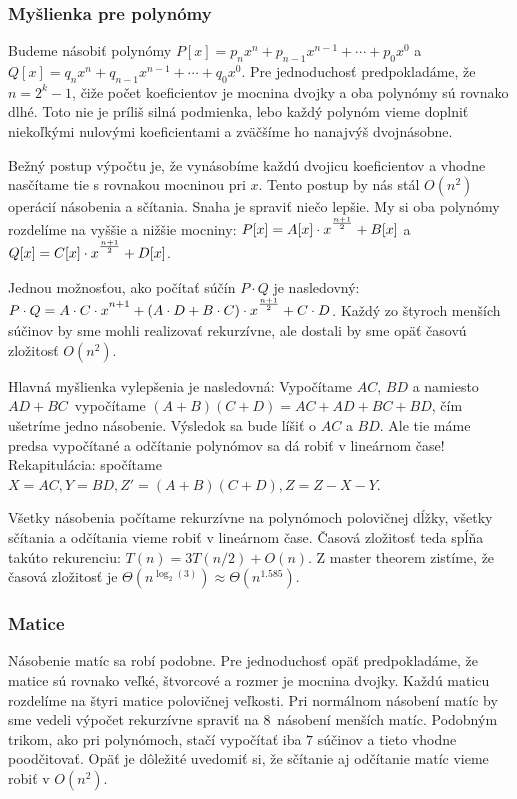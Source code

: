         \subsubsection{Myšlienka pre polynómy}
        Budeme násobiť polynómy $P[x] = p_nx^n + p_{n-1}x^{n-1} + \cdots + p_0x^0 $ a $Q[x] = q_nx^n + q_{n-1}x^{n-1} + \cdots + q_0x^0$.
        Pre jednoduchosť predpokladáme, že $n = 2^k - 1$, čiže počet koeficientov je mocnina dvojky a oba polynómy sú rovnako
        dlhé. Toto nie je príliš silná podmienka, lebo každý polynóm vieme doplniť niekoľkými nulovými koeficientami a zväčšíme
        ho nanajvýš dvojnásobne.

        Bežný postup výpočtu je, že vynásobíme každú dvojicu koeficientov a vhodne nasčítame tie s rovnakou mocninou pri $x$.
        Tento postup by nás stál $O(n^2)$ operácií násobenia a sčítania. Snaha je spraviť niečo lepšie.
        My si oba polynómy rozdelíme na vyššie a nižšie mocniny: $P[x] = A[x] \cdot x\strut^{\frac{n+1}{2}} + B[x]$ a $Q[x] = C[x] \cdot x\strut^{\frac{n+1}{2}} + D[x]$.

        Jednou možnosťou, ako počítať súčín $P\cdot Q$ je nasledovný: $P \cdot Q = A \cdot C \cdot x\strut^{n+1} + (A \cdot D + B \cdot C) \cdot x\strut^{\frac{n+1}{2}} + C \cdot D$.
        Každý zo štyroch menších súčinov by sme mohli realizovať rekurzívne, ale dostali by sme opäť časovú zložitosť
        $O(n^2)$.
        
        Hlavná myšlienka vylepšenia je nasledovná: Vypočítame $AC$, $BD$ a namiesto $AD + BC$ vypočítame $(A + B)(C + D) = AC + AD + BC + BD$,
        čím ušetríme jedno násobenie. Výsledok sa bude líšiť o $AC$ a $BD$. Ale tie máme predsa vypočítané a odčítanie polynómov
        sa dá robiť v lineárnom čase! Rekapitulácia: spočítame $X = AC, Y = BD, Z' = (A+B)(C+D), Z = Z - X - Y$.

        Všetky násobenia počítame rekurzívne na polynómoch polovičnej dĺžky, všetky sčítania a odčítania vieme robiť v lineárnom čase.
        Časová zložitosť teda spĺňa takúto rekurenciu: $T(n) = 3T(n/2) + O(n)$. Z master theorem zistíme, že časová zložitosť je $\Theta(n^{\log_2(3)}) \approx \Theta(n^{1.585})$.

        \subsubsection{Matice}
        Násobenie matíc sa robí podobne. Pre jednoduchosť opäť predpokladáme, že matice sú rovnako veľké, štvorcové a rozmer je
        mocnina dvojky. Každú maticu rozdelíme na štyri matice polovičnej veľkosti. Pri normálnom násobení matíc by sme
        vedeli výpočet rekurzívne spraviť na $8$ násobení menších matíc. Podobným trikom, ako pri polynómoch,
        stačí vypočítať iba $7$ súčinov a tieto vhodne poodčitovať. Opäť je dôležité uvedomiť si, že sčítanie aj
        odčítanie matíc vieme robiť v $O(n^2)$.
        
